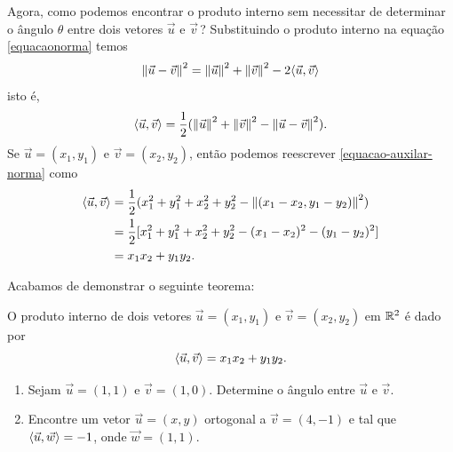 \documentclass{beamer}
\begin{document}
    \begin{frame}
        Agora, como podemos encontrar o produto interno sem necessitar de determinar o ângulo $\theta$ entre dois vetores $\vec{u}$ e $\vec{v}$\,? Substituindo o produto interno na equação \eqref{equacaonorma} temos
        \[
          \left\Vert{\vec{u} - \vec{v}}\right\Vert^2 = \left\Vert{\vec{u}}\right\Vert^2 + \left\Vert{\vec{v}}\right\Vert^2 - 2\langle \vec{u}, \vec{v} \rangle
        \]
        isto é,
        \begin{align}\label{equacao-auxilar-norma}
          \langle \vec{u}, \vec{v} \rangle = \dfrac{1}{2}(\left\Vert{\vec{u}}\right\Vert^2 + \left\Vert{\vec{v}}\right\Vert^2 - \left\Vert{\vec{u} - \vec{v}}\right\Vert^2).
        \end{align}
        Se $\vec{u} = (x_1, y_1)$ e $\vec{v} = (x_2, y_2)$, então podemos reescrever \eqref{equacao-auxilar-norma} como
        \begin{align*}
          \langle \vec{u}, \vec{v} \rangle &= \dfrac{1}{2}(x_1^2 + y_1^2 + x_2^2 + y_2^2 - \left\Vert{(x_1 - x_2, y_1 - y_2)}\right\Vert^2)\\
          &= \dfrac{1}{2}[x_1^2 + y_1^2 + x_2^2 + y_2^2 - (x_1 - x_2)^2 - (y_1 - y_2)^2]\\
          &= x_1x_2 + y_1y_2.
        \end{align*}
    \end{frame}

    \begin{frame}
        Acabamos de demonstrar o seguinte teorema:
        \begin{teorema}
          O produto interno de dois vetores $\vec{u} = (x_1, y_1)$ e $\vec{v} = (x_2, y_2)$ em $\mathbb{R}^2$ é dado por
          \[
            \langle \vec{u}, \vec{v} \rangle = x_1x_2 + y_1y_2.
          \]
        \end{teorema}
    \end{frame}

    \begin{frame}
        \begin{exemplos}
          \begin{enumerate}[label=({\roman*})]
            \item Sejam $\vec{u} = (1, 1)$ e $\vec{v} = (1,0)$. Determine o ângulo entre $\vec{u}$ e $\vec{v}$.
            \item Encontre um vetor $\vec{u} = (x, y)$ ortogonal a $\vec{v} = (4, -1)$ e tal que $\langle \vec{u}, \vec{w} \rangle = -1$, onde $\vec{w} = (1,1)$.
          \end{enumerate}
        \end{exemplos}
    \end{frame}
\end{document}
